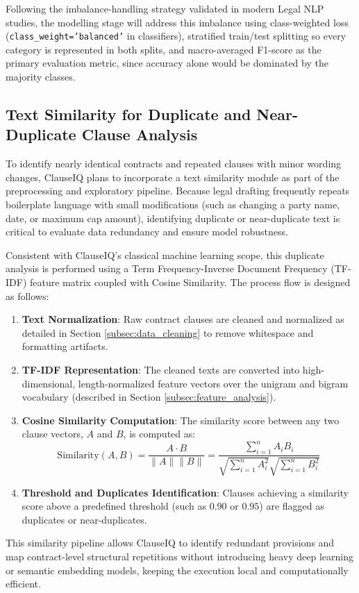 \documentclass[12pt, a4paper]{report}
\begin{document}
Following the imbalance-handling strategy validated in modern Legal NLP studies, the modelling stage will address this imbalance using class-weighted loss (\texttt{class\_weight='balanced'} in classifiers), stratified train/test splitting so every category is represented in both splits, and macro-averaged F1-score as the primary evaluation metric, since accuracy alone would be dominated by the majority classes.

\subsection{Text Similarity for Duplicate and Near-Duplicate Clause Analysis}
\label{subsec:text_similarity_duplicates}
To identify nearly identical contracts and repeated clauses with minor wording changes, ClauseIQ plans to incorporate a text similarity module as part of the preprocessing and exploratory pipeline. Because legal drafting frequently repeats boilerplate language with small modifications (such as changing a party name, date, or maximum cap amount), identifying duplicate or near-duplicate text is critical to evaluate data redundancy and ensure model robustness.

Consistent with ClauseIQ's classical machine learning scope, this duplicate analysis is performed using a Term Frequency-Inverse Document Frequency (TF-IDF) feature matrix coupled with Cosine Similarity. The process flow is designed as follows:
\begin{enumerate}
    \item \textbf{Text Normalization}: Raw contract clauses are cleaned and normalized as detailed in Section \ref{subsec:data_cleaning} to remove whitespace and formatting artifacts.
    \item \textbf{TF-IDF Representation}: The cleaned texts are converted into high-dimensional, length-normalized feature vectors over the unigram and bigram vocabulary (described in Section \ref{subsec:feature_analysis}).
    \item \textbf{Cosine Similarity Computation}: The similarity score between any two clause vectors, $A$ and $B$, is computed as:
    \begin{equation}
        \text{Similarity}(A, B) = \frac{A \cdot B}{\|A\| \|B\|} = \frac{\sum_{i=1}^n A_i B_i}{\sqrt{\sum_{i=1}^n A_i^2} \sqrt{\sum_{i=1}^n B_i^2}}
    \end{equation}
    \item \textbf{Threshold and Duplicates Identification}: Clauses achieving a similarity score above a predefined threshold (such as $0.90$ or $0.95$) are flagged as duplicates or near-duplicates.
\end{enumerate}
This similarity pipeline allows ClauseIQ to identify redundant provisions and map contract-level structural repetitions without introducing heavy deep learning or semantic embedding models, keeping the execution local and computationally efficient.
\end{document}
